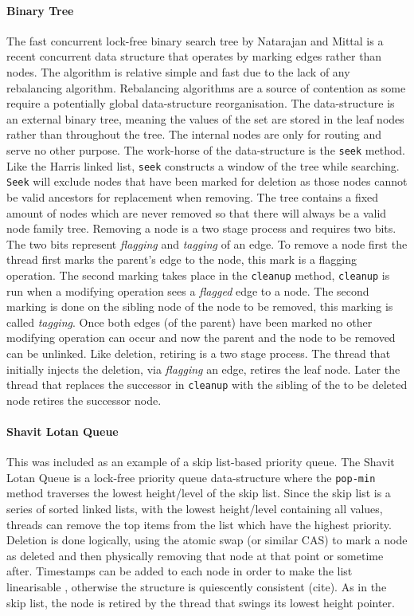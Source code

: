 \paragraph{Binary Tree} The fast concurrent lock-free binary search tree by Natarajan and Mittal is a recent concurrent data structure that operates by marking edges rather than nodes.\cite{LFBinaryTree} The algorithm is relative simple and fast due to the lack of any rebalancing algorithm. Rebalancing algorithms are a source of contention as some require a potentially global data-structure reorganisation. The data-structure is an external binary tree, meaning the values of the set are stored in the leaf nodes rather than throughout the tree. The internal nodes are only for routing and serve no other purpose. The work-horse of the data-structure is the \texttt{seek} method. Like the Harris linked list, \texttt{seek} constructs a window of the tree while searching. \texttt{Seek} will exclude nodes that have been marked for deletion as those nodes cannot be valid ancestors for replacement when removing. The tree contains a fixed amount of nodes which are never removed so that there will always be a valid node family tree. Removing a node is a two stage process and requires two bits. The two bits represent \textit{flagging} and \textit{tagging} of an edge. To remove a node first the thread first marks the parent's edge to the node, this mark is a flagging operation. The second marking takes place in the \texttt{cleanup} method, \texttt{cleanup} is run when a modifying operation sees a \textit{flagged} edge to a node. The second marking is done on the sibling node of the node to be removed, this marking is called \textit{tagging}. Once both edges (of the parent) have been marked no other modifying operation can occur and now the parent and the node to be removed can be unlinked. Like deletion, retiring is a two stage process. The thread that initially injects the deletion, via \textit{flagging} an edge, retires the leaf node. Later the thread that replaces the successor in \texttt{cleanup} with the sibling of the to be deleted node retires the successor node.


\paragraph{Shavit Lotan Queue} This was included as an example of a skip list-based priority queue. \cite{ShavitLotanQueue} The Shavit Lotan Queue is a lock-free priority queue data-structure where the \texttt{pop-min} method traverses the lowest height/level of the skip list. Since the skip list is a series of sorted linked lists, with the lowest height/level containing all values, threads can remove the top items from the list which have the highest priority. Deletion is done logically, using the atomic swap (or similar CAS) to mark a node as deleted and then physically removing that node at that point or sometime after. Timestamps can be added to each node in order to make the list linearisable \cite{Linearizability}, otherwise the structure is quiescently consistent (cite). As in the skip list, the node is retired by the thread that swings its lowest height pointer.

